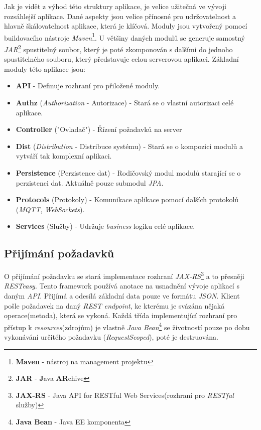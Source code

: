 Jak je vidět z výhod této struktury aplikace, je velice užitečná ve vývoji rozsáhlejší aplikace.
Dané aspekty jsou velice přínosné pro udržovatelnost a hlavně škálovatelnost aplikace, která je klíčová.
Moduly jsou vytvořený pomocí buildovacího nástroje \emph{Maven}\footnote{\textbf{Maven} - nástroj na management projektu}.
U většiny daných modulů se generuje samostný \emph{JAR}\footnote{\textbf{JAR} - \textbf{J}ava \textbf{AR}chive} spustitelný soubor, který je poté zkomponován s dalšími do jednoho spustitelného souboru, který představuje celou serverovou aplikaci.
\newline
Základní moduly této aplikace jsou:
\begin{itemize}
  \item \textbf{API} - Definuje rozhraní pro přiložené moduly.
  \item \textbf{Authz} (\emph{Authorization} - Autorizace) - Stará se o vlastní autorizaci celé aplikace.
  \item \textbf{Controller} ("Ovladač") - Řízení požadavků na server
  \item \textbf{Dist} (\emph{Distribution} - Distribuce systému) - Stará se o kompozici modulů a vytváří tak komplexní aplikaci.
  \item \textbf{Persistence} (Perzistence dat) - Rodičovský modul modulů starající se o perzistenci dat. Aktuálně pouze submodul \emph{JPA}.
  \item \textbf{Protocols} (Protokoly) - Komunikace aplikace pomocí dalších protokolů (\emph{MQTT}, \emph{WebSockets}).
  \item \textbf{Services} (Služby) - Udržuje \emph{business} logiku celé aplikace.
\end{itemize}

\newpage
\subsection*{Přijímání požadavků}
\label{impl:backend:request}
O přijímání požadavku se stará implementace rozhraní \emph{JAX-RS}\footnote{\textbf{JAX-RS} - Java API for RESTful Web Services(rozhraní pro \emph{RESTful} služby)} a to přesněji \emph{RESTeasy}.
Tento framework používá anotace na usnadnění vývoje aplikací s daným \emph{API}.
Přijímá a odesílá základní data pouze ve formátu \emph{JSON}.
Klient pošle požadavek na daný \emph{REST endpoint}, ke kterému je svázána nějaká operace(metoda), která se vykoná.
Každá třída implementující rozhraní pro přístup k \emph{resources}(zdrojům) je vlastně \emph{Java Bean}\footnote{\textbf{Java Bean} - Java EE komponenta} se životností pouze po dobu vykonávání určitého požadavku (\emph{RequestScoped}), poté je destruována.

